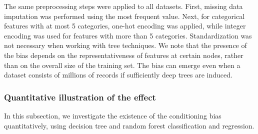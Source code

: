 \documentclass[5p,twocolumn,authoryear]{elsarticle}
\theoremstyle{plain}%
\theoremstyle{remark}%
\theoremstyle{definition}%
\begin{document}
The same preprocessing steps were applied to all datasets. First, missing data imputation was performed using the most frequent value. Next, for categorical features with at most 5 categories, one-hot encoding was applied, while integer encoding was used for features with more than 5 categories. Standardization was not necessary when working with tree techniques. We note that the presence of the bias depends on the representativeness of features at certain nodes, rather than on the overall size of the training set. The bias can emerge even when a dataset consists of millions of records if sufficiently deep trees are induced.


\subsubsection{Quantitative illustration of the effect}
\label{sec:tests-quant}

In this subsection, we investigate the existence of the conditioning bias quantitatively, using decision tree and random forest classification and regression.

\begin{table}[tbp]
  \caption{Presence of the bias and evaluation of the proposed method, using the corrected significance testing procedure of Section \ref{sec:tests-testing} (repeated holdout, $p=0.9$, $R=100$, equivalent to a $K=10$ correction floor). In each block (classification and regression, decision tree and random forest rows per dataset), the columns $\rho$ and $\rho_k$ indicate the proportion of nodes with thresholds on feature domain values when the model is fitted to all data and, on average, to the training portion of the evaluation splits, respectively. The columns $auc_{\leq}$/$auc_{<}$ (and $r^2_{\leq}$/$r^2_{<}$) report the absolute mean performance scores of the default and non-default operators, with $auc_d$/$r^2_d$ their difference and $\ast$ in $p_{\neq}$ indicating the corrected test rejects the equality of the two operators' mean scores ($p<0.05$). The columns $auc_{avg}$/$r^2_{avg}$ report the proposed averaging method's absolute mean score, with $\ast$ in $p_{avg}$ indicating a statistically significant difference from the worse-performing of the two individual operators (worst$(\leq, <)$).}
  \label{tab:proof}
  \centering
    \begin{footnotesize}
      \begin{minipage}[t]{0.49\textwidth}
        \centering
        
      \end{minipage}
      \hfill
      \begin{minipage}[t]{0.49\textwidth}
        \centering
        
      \end{minipage}
    \end{footnotesize}
\end{table}
\end{document}
